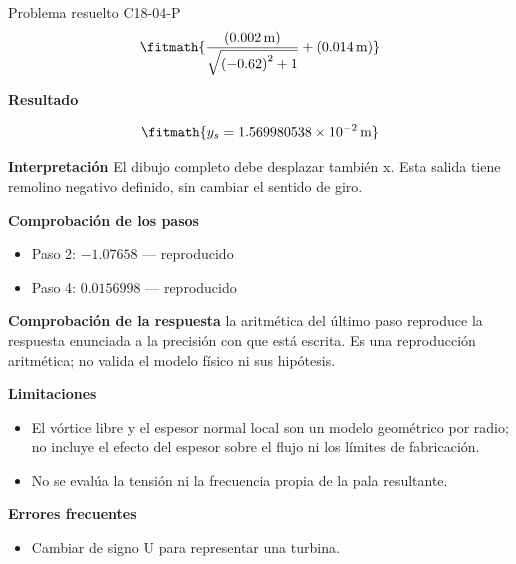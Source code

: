 \documentclass[10pt,openany]{book}
\begin{document}
\begin{studiumworked}{Problema resuelto C18-04-P}
\[
\fitmath{\frac{\left(0.002\,\mathrm{m}\right)}{\sqrt{\left(-0.62\right)^{2} + 1}} + \left(0.014\,\mathrm{m}\right)}
\]

\noindent\textbf{Resultado}

\[
\fitmath{y_s=1.569980538\times10^{-2}\,\mathrm{m}}
\]

\noindent\textbf{Interpretación}
El dibujo completo debe desplazar también x. Esta salida tiene remolino negativo definido, sin cambiar el sentido de giro.

\noindent\textbf{Comprobación de los pasos}
\begin{itemize}
\item Paso 2: $-1.07658$ — reproducido
\item Paso 4: $0.0156998$ — reproducido
\end{itemize}

\noindent\textbf{Comprobación de la respuesta} la aritmética del último paso reproduce la respuesta enunciada a la precisión con que está escrita. Es una reproducción aritmética; no valida el modelo físico ni sus hipótesis.

\noindent\textbf{Limitaciones}
\begin{itemize}
\item El vórtice libre y el espesor normal local son un modelo geométrico por radio; no incluye el efecto del espesor sobre el flujo ni los límites de fabricación.
\item No se evalúa la tensión ni la frecuencia propia de la pala resultante.
\end{itemize}

\noindent\textbf{Errores frecuentes}
\begin{itemize}
\item Cambiar de signo U para representar una turbina.
\end{itemize}
\end{studiumworked}
\end{document}

